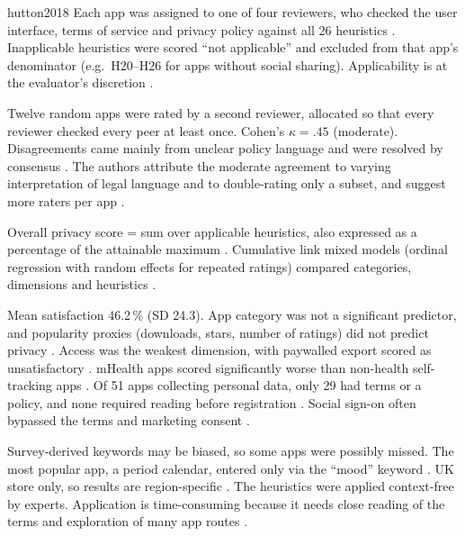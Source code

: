 \begin{papercard}{hutton2018}
 Each app was assigned to one of four reviewers, who checked the user interface, terms of service and privacy policy against all 26 heuristics . Inapplicable heuristics were scored ``not applicable'' and excluded from that app's denominator (e.g.\ H20--H26 for apps without social sharing). Applicability is at the evaluator's discretion .

 Twelve random apps were rated by a second reviewer, allocated so that every reviewer checked every peer at least once. Cohen's $\kappa=.45$ (moderate). Disagreements came mainly from unclear policy language and were resolved by consensus . The authors attribute the moderate agreement to varying interpretation of legal language and to double-rating only a subset, and suggest more raters per app .

 Overall privacy score = sum over applicable heuristics, also expressed as a percentage of the attainable maximum . Cumulative link mixed models (ordinal regression with random effects for repeated ratings) compared categories, dimensions and heuristics .

 Mean satisfaction 46.2\,\% (SD 24.3). App category was not a significant predictor, and popularity proxies (downloads, stars, number of ratings) did not predict privacy . Access was the weakest dimension, with paywalled export scored as unsatisfactory . mHealth apps scored significantly worse than non-health self-tracking apps . Of 51 apps collecting personal data, only 29 had terms or a policy, and none required reading before registration . Social sign-on often bypassed the terms and marketing consent .

 Survey-derived keywords may be biased, so some apps were possibly missed. The most popular app, a period calendar, entered only via the ``mood'' keyword . UK store only, so results are region-specific . The heuristics were applied context-free by experts. Application is time-consuming because it needs close reading of the terms and exploration of many app routes .


\end{papercard}
